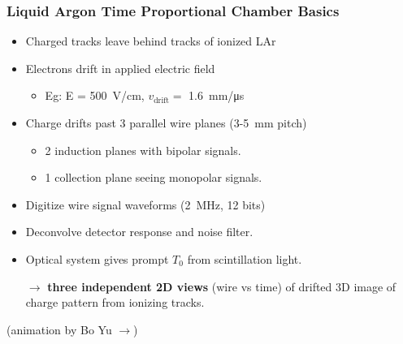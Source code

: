 \begin{frame}
  \frametitle{\textbf{L}iquid \textbf{Ar}gon \textbf{T}ime \textbf{P}roportional \textbf{C}hamber Basics}

  \begin{itemize}
  \item Charged tracks leave behind tracks of ionized LAr
  \item Electrons drift in applied electric field 
    \begin{itemize} \footnotesize
    \item Eg: E = \SI{500}{\volt/\cm}, $v_{\mbox{drift}}=$ \SI{1.6}{\milli\meter/\micro\second}
    \end{itemize}
  \item Charge drifts past 3 parallel wire planes (\num{3}-\SI{5}{\milli\meter} pitch)
    \begin{itemize}
    \item 2 induction planes with bipolar signals.
    \item 1 collection plane seeing monopolar signals.
    \end{itemize}
  \item Digitize wire signal waveforms (\SI{2}{\mega\hertz}, 12 bits)
  \item Deconvolve detector response and noise filter.
  \item Optical system gives prompt $T_0$ from scintillation light.
  \end{itemize}

  \begin{itemize}
  \item [$\rightarrow$] \textbf{three independent 2D views} (wire vs time) of drifted 3D image of charge pattern from ionizing tracks.
  \end{itemize}

  \vfill

  \flushright\footnotesize{(animation by Bo Yu $\rightarrow$)}

\end{frame}

\begin{frame}[fragile]
  \begin{center}
  \end{center}
\end{frame}

